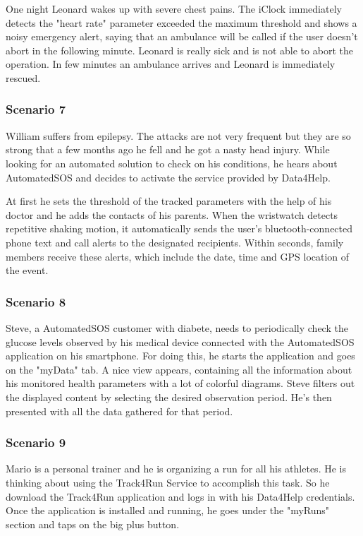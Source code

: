 One night Leonard wakes up with severe chest pains. The iClock immediately detects the "heart rate" parameter exceeded the maximum threshold and shows a noisy emergency alert, saying that an ambulance will be called if the user doesn't abort in the following minute. Leonard is really sick and is not able to abort the operation. In few minutes an ambulance arrives and Leonard is immediately rescued.

\subsubsection{Scenario 7}
William suffers from epilepsy. The attacks are not very frequent but they are so strong that a few months ago he fell and he got a nasty head injury. While looking for an automated solution to check on his conditions, he hears about AutomatedSOS and decides to activate the service provided by Data4Help.

At first he sets the threshold of the tracked parameters with the help of his doctor and he adds the contacts of his parents. When the wristwatch detects repetitive shaking motion, it automatically sends the user’s bluetooth-connected phone text and call alerts to the designated recipients. Within seconds, family members receive these alerts, which include the date, time and GPS location of the event.

\subsubsection{Scenario 8}
Steve, a AutomatedSOS customer with diabete, needs to periodically check the glucose levels observed by his medical device connected with the AutomatedSOS application on his smartphone. For doing this, he starts the application and goes on the "myData" tab. A nice view appears, containing all the information about his monitored health parameters with a lot of colorful diagrams. Steve filters out the displayed content by selecting the desired observation period. He's then presented with all the data gathered for that period. 

\subsubsection{Scenario 9}
Mario is a personal trainer and he is organizing a run for all his athletes. He is thinking about using the Track4Run Service to accomplish this task. So he download the Track4Run application and logs in with his Data4Help credentials. Once the application is installed and running, he goes under the "myRuns" section and taps on the big plus button. 

